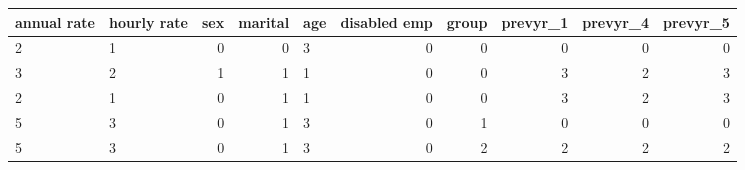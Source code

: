 \begin{tabular}{llrrlrrrrr}
\toprule
annual rate & hourly rate &  sex &  marital & age &  disabled emp &  group &  prevyr\_1 &  prevyr\_4 &  prevyr\_5 \\
\midrule
          2 &           1 &    0 &        0 &   3 &             0 &      0 &         0 &         0 &         0 \\
          3 &           2 &    1 &        1 &   1 &             0 &      0 &         3 &         2 &         3 \\
          2 &           1 &    0 &        1 &   1 &             0 &      0 &         3 &         2 &         3 \\
          5 &           3 &    0 &        1 &   3 &             0 &      1 &         0 &         0 &         0 \\
          5 &           3 &    0 &        1 &   3 &             0 &      2 &         2 &         2 &         2 \\
\bottomrule
\end{tabular}
